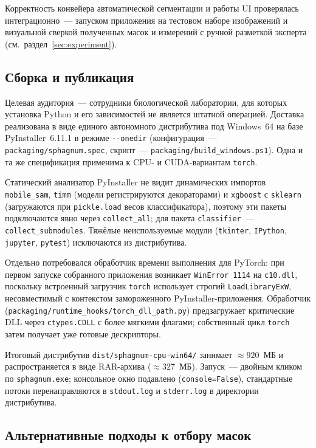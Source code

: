 Корректность конвейера автоматической сегментации и работы UI проверялась
интеграционно~--- запуском приложения на тестовом наборе изображений и визуальной
сверкой полученных масок и измерений с ручной разметкой эксперта (см.\ раздел~\ref{sec:experiment}).

\subsection{Сборка и публикация}
\label{sec:packaging}

Целевая аудитория~--- сотрудники биологической лаборатории, для которых установка
Python и его зависимостей не является штатной операцией. Доставка реализована
в виде единого автономного дистрибутива под Windows~64 на базе PyInstaller~6.11.1
в режиме \texttt{-{}-onedir} (конфигурация~--- \texttt{packaging/sphagnum.spec},
скрипт~--- \texttt{packaging/build\_windows.ps1}). Одна и та же спецификация применима
к CPU- и CUDA-вариантам \texttt{torch}.

Статический анализатор PyInstaller не видит динамических импортов
\texttt{mobile\_sam}, \texttt{timm} (модели регистрируются декораторами) и
\texttt{xgboost} с \texttt{sklearn} (загружаются при \texttt{pickle.load} весов
классификатора), поэтому эти пакеты подключаются явно через \texttt{collect\_all};
для пакета \texttt{classifier}~--- \texttt{collect\_submodules}. Тяжёлые
неиспользуемые модули (\texttt{tkinter}, \texttt{IPython}, \texttt{jupyter},
\texttt{pytest}) исключаются из дистрибутива.

Отдельно потребовался обработчик времени выполнения для PyTorch: при первом
запуске собранного приложения возникает \texttt{WinError 1114} на
\texttt{c10.dll}, поскольку встроенный загрузчик \texttt{torch} использует
строгий \texttt{LoadLibraryExW}, несовместимый с контекстом замороженного
PyInstaller-приложения. Обработчик
(\texttt{packaging/runtime\_hooks/torch\_dll\_path.py}) предзагружает критические
DLL через \texttt{ctypes.CDLL} с более мягкими флагами; собственный цикл
\texttt{torch} затем получает уже готовые дескрипторы.

Итоговый дистрибутив \texttt{dist/sphagnum-cpu-win64/} занимает $\approx 920$~МБ
и распространяется в виде RAR-архива ($\approx 327$~МБ). Запуск~--- двойным
кликом по \texttt{sphagnum.exe}; консольное окно подавлено
(\texttt{console=False}), стандартные потоки перенаправляются в \texttt{stdout.log}
и \texttt{stderr.log} в директории дистрибутива.

\subsection{Альтернативные подходы к отбору масок}
\label{sec:classifier_alts}

